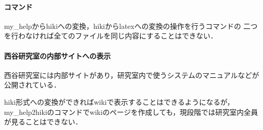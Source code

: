 \paragraph{コマンド}
\begin{description}
\item my\_helpからhikiへの変換，hikiからlatexへの変換の操作を行うコマンドの
二つを行わなければ全てのファイルを同じ内容にすることはできない．
\end{description}

\paragraph{西谷研究室の内部サイトへの表示}
\begin{description}
\item 西谷研究室には内部サイトがあり，研究室内で使うシステムのマニュアルなどが公開されている．
\item hiki形式への変換ができればwikiで表示することはできるようになるが，
my\_help2hikiのコマンドでwikiのページを作成しても，現段階では研究室内全員が見ることはできない．
\end{description}